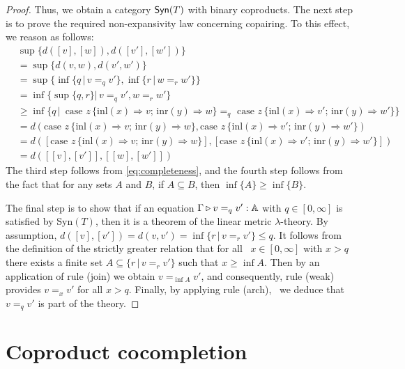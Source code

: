 \begin{proof}
  Thus, we obtain a category $\mathsf{Syn}(T)$ with binary coproducts.
 The next step is to prove the required non-expansivity law concerning copairing. To this effect, we reason as follows:
  \begin{align*}
    & \sup{\{d([v],[w]),d([v'],[w']) \}}  \\
    & = \sup{\{d(v,w),d(v',w') \}} \\
    & = \sup {\{ \inf{\{q \, \vert \, v=_q v'\}},\inf{\{r \, \vert \, w=_r w'\}}  \}} \\
    & = \inf{\{ \sup \{ q, r \} \vert \, v=_q v', w=_r w' \}} &  \\
    & \geq  \inf{ \{ q  \,\vert \, \text{ case } z \,   \{\text{inl} (x) \Rightarrow v ; \, \text{inr} (y) \Rightarrow w\} =_{q} \text{ case } z \,  \{\text{inl} (x) \Rightarrow v' ; \,\text{inr} (y) \Rightarrow w'\} \} } &  \\ 
    & = d(\text{case } z \,   \{\text{inl} (x) \Rightarrow v ; \, \text{inr} (y) \Rightarrow w\}, \text{case } z \,  \{\text{inl} (x) \Rightarrow v' ; \,\text{inr} (y) \Rightarrow w'\}) \\
    & = d([\text{case } z \,   \{\text{inl} (x) \Rightarrow v ; \, \text{inr} (y) \Rightarrow w\}], [\text{case } z \,  \{\text{inl} (x) \Rightarrow v' ; \,\text{inr} (y) \Rightarrow w'\}]) \\
    & = d([[v],[v']],[[w],[w']])  
  \end{align*}
   The third step follows from \autoref{eq:completeness}, and the fourth step follows from the fact that for any sets $A$ and $B$, if $A \subseteq B$, then $\inf\{A\} \geq \inf\{B\}$.

 The final step is to show that if an equation $\Gamma \triangleright v =_q v' : \mathbb{A}$ with $q \in [0, \infty]$ is satisfied by Syn$(T)$, then it is a theorem of the linear metric $\lambda$-theory. By assumption, $d([v],[v']) = d(v,v') =  \inf{ \{r \, \vert \, v =_r v'\}} \leq q$. It follows from the definition of the strictly greater relation that for all
 $x \in [0, \infty]$ with $x>q$ there exists a finite set $A \subseteq \{r \, \vert \, v =_r v'\}$ such that $x \geq \inf{A}$. Then by an
 application of rule (join) we obtain $v =_{\inf{A}} v'$, and consequently, rule (weak) provides $v =_x v'$ for all $x > q$. Finally, by applying rule (arch),  we deduce that $v =_q v'$ is part of the theory.
\end{proof}


\section{Coproduct cocompletion} \label{sec:Coproduct_cocompletion}


